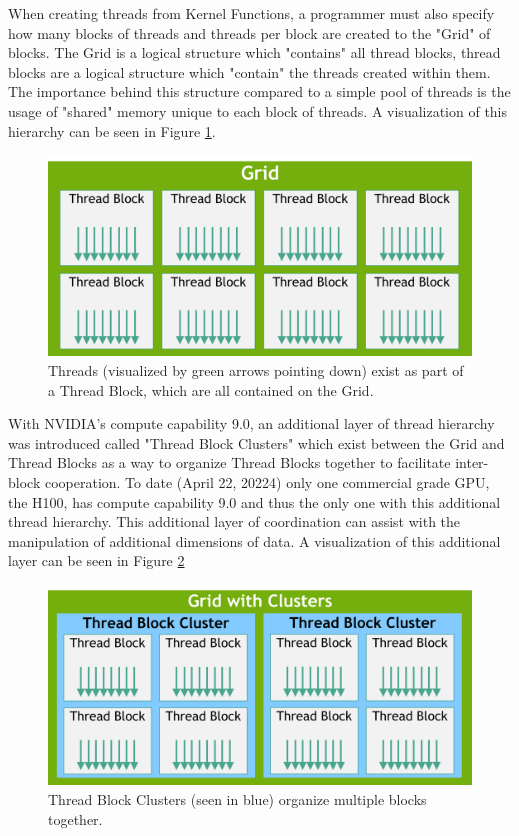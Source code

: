\documentclass[11pt]{report}
\begin{document}
    When creating threads from Kernel Functions, a programmer must also specify how many blocks of threads and threads per block are created to the "Grid" of blocks. The Grid is a logical structure which "contains" all thread blocks, thread blocks are a logical structure which "contain" the threads created within them. The importance behind this structure compared to a simple pool of threads is the usage of "shared" memory unique to each block of threads. A visualization of this hierarchy can be seen in Figure \ref{fig:Thread-Hierarchy}.

    \begin{figure}[!h]
        \centering
        \includegraphics[width=\textwidth]{Images/grid-of-thread-blocks.png}
        \caption{Threads (visualized by green arrows pointing down) exist as part of a Thread Block, which are all contained on the Grid.\cite{CPP_GUIDE}}
        \label{fig:Thread-Hierarchy}
    \end{figure}
    
    With NVIDIA's compute capability 9.0, an additional layer of thread hierarchy was introduced called "Thread Block Clusters" which exist between the Grid and Thread Blocks as a way to organize Thread Blocks together to facilitate inter-block cooperation. To date (April 22, 20224) only one commercial grade GPU, the H100, has compute capability 9.0 and thus the only one with this additional thread hierarchy\cite{CPP_GUIDE}\cite{COMPUTE_CAPABILITY}. This additional layer of coordination can assist with the manipulation of additional dimensions of data. A visualization of this additional layer can be seen in Figure \ref{fig:Thread-Hierarchy-with-Clusters}

    \begin{figure}[!h]
        \centering
        \includegraphics[width=\textwidth]{Images/grid-of-clusters.png}
        \caption{Thread Block Clusters (seen in blue) organize multiple blocks together\cite{CPP_GUIDE}.}
        \label{fig:Thread-Hierarchy-with-Clusters}
    \end{figure}
    
\end{document}
